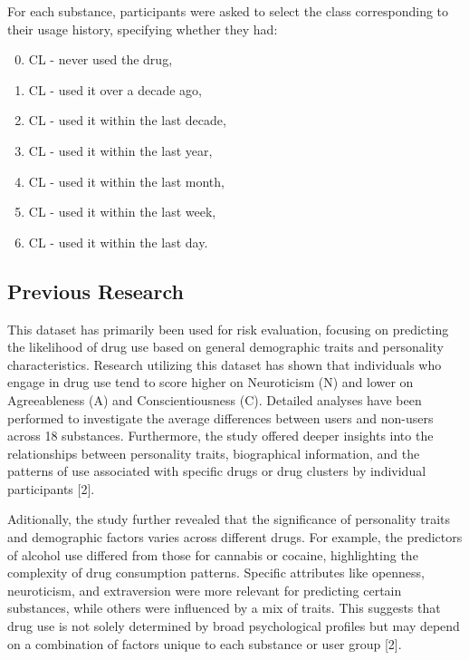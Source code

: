 \documentclass{article}
\begin{document}
For each substance, participants were asked to select the class corresponding to their usage history, specifying whether they had:
\begin{enumerate}
    \setcounter{enumi}{-1} %
    \item CL -  never used the drug,
    \item CL - used it over a decade ago,
    \item CL - used it within the last decade,
    \item CL - used it within the last year,
    \item CL - used it within the last month,
    \item CL - used it within the last week,
    \item CL - used it within the last day.
    
\end{enumerate}

\subsection{Previous Research}

\hspace{1cm}This dataset has primarily been used for risk evaluation, focusing on predicting the likelihood of drug use based on general demographic traits and personality characteristics. Research utilizing this dataset has shown that individuals who engage in drug use tend to score higher on Neuroticism (N) and lower on Agreeableness (A) and Conscientiousness (C). Detailed analyses have been performed to investigate the average differences between users and non-users across 18 substances. Furthermore, the study offered deeper insights into the relationships between personality traits, biographical information, and the patterns of use associated with specific drugs or drug clusters by individual participants [2]. 

\hspace{1cm}Aditionally, the study further revealed that the significance of personality traits and demographic factors varies across different drugs. For example, the predictors of alcohol use differed from those for cannabis or cocaine, highlighting the complexity of drug consumption patterns. Specific attributes like openness, neuroticism, and extraversion were more relevant for predicting certain substances, while others were influenced by a mix of traits. This suggests that drug use is not solely determined by broad psychological profiles but may depend on a combination of factors unique to each substance or user group [2].
\end{document}
